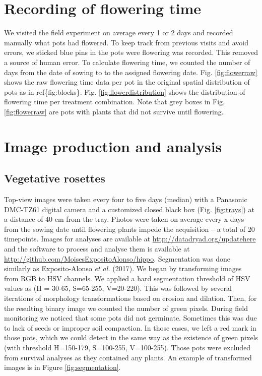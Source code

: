 \documentclass[12pt,]{article}
\begin{document}
\section{Recording of flowering time}\label{recording-of-flowering-time}

We visited the field experiment on average every 1 or 2 days and
recorded manually what pots had flowered. To keep track from previous
visits and avoid errors, we sticked blue pins in the pots were flowering
was recorded. This removed a source of human error. To calculate
flowering time, we counted the number of days from the date of sowing to
to the assigned flowering date. Fig. \ref{fig:flowerraw} shows the raw
flowering time data per pot in the original spatial distribution of pots
as in ref\{fig:blocks\}. Fig. \ref{fig:flowerdistribution} shows the
distribution of flowering time per treatment combination. Note that grey
boxes in Fig. \ref{fig:flowerraw} are pots with plants that did not
survive until flowering.

\section{Image production and
analysis}\label{image-production-and-analysis}

\subsection{Vegetative rosettes}\label{vegetative-rosettes}

Top-view images were taken every four to five days (median) with a
Panasonic DMC-TZ61 digital camera and a customized closed black box
(Fig. \ref{fig:trays}) at a distance of 40 cm from the tray. Photos were
taken on average every x days from the sowing date until flowering
plants impede the acquisition -- a total of 20 timepoints. Images for
analyses are available at \url{http://datadryad.org/updatehere} and the
software to process and analyse them is available at
\url{http://github.com/MoisesExpositoAlonso/hippo}. Segmentation was
done similarly as Exposito-Alonso \emph{et al.} (2017). We began by
transforming images from RGB to HSV channels. We applied a hard
segmentation threshold of HSV values as (H = 30-65, S=65-255, V=20-220).
This was followed by several iterations of morphology transformations
based on erosion and dilation. Then, for the resulting binary image we
counted the number of green pixels. During field monitoring we noticed
that some pots did not germinate. Sometimes this was due to lack of
seeds or improper soil compaction. In those cases, we left a red mark in
those pots, which we could detect in the same way as the existence of
green pixels (with threshold H=150-179, S=100-255, V=100-255). Those
pots were excluded from survival analyses as they contained any plants.
An example of transformed images is in Figure \ref{fig:segmentation}.
\end{document}
